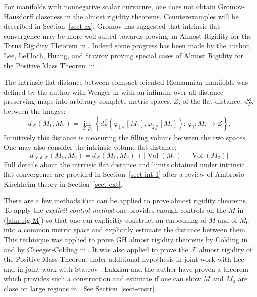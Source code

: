 \documentclass[12pt]{amsart}
\begin{document}
For manifolds with nonnegative scalar curvature, one does not
obtain Gromov-Hausdorff closeness in the almost rigidity theorems.
Counterexamples will be described in Section~\ref{sect-ex}.   
Gromov has suggested 
that intrinsic flat convergence may be more well suited towards proving
an Almost Rigidity for the Torus Rigidity Theorem in \cite{Gromov-Dirac}.  Indeed 
some progress has been made by the author, Lee, LeFloch,
Huang, and Stavrov proving special cases of Almost Rigidity for the
Positive Mass Theorem in \cite{LeeSormani1}\cite{LeFloch-Sormani-1}
\cite{HLS}\cite{Sormani-Stavrov-1}.   

The intrinsic flat distance between compact
oriented Riemannian manifolds was defined by the author with
Wenger in \cite{SorWen2} with an infimum over
all distance preserving maps into arbitrary complete metric spaces, $Z$,
of the flat distance, $d_F^Z$, between the images:
\begin{equation} \label{def-IF-1}
d_{\mathcal{F}}(M_1, M_2) = \inf_{Z, \varphi_i}\left\{ d_F^Z(\varphi_{1\#}[M_1], \varphi_{2\#}[M_2]):
\, \varphi_i: M_i\to Z
\right\}. 
\end{equation}
Intuitively this distance is measuring the filling volume between the two spaces.
One may also consider the intrinsic volume flat distance:
\begin{equation}\label{def-volF-1}
d_{{\operatorname{Vol}}\mathcal{F}}(M_1, M_2) = d_{\mathcal{F}}(M_1, M_2)
+|{\operatorname{Vol}}(M_1) - {\operatorname{Vol}}(M_2)|
\end{equation}
Full details about the intrinsic flat distance and limits obtained under
intrinsic flat convergence are provided in Section~\ref{sect-int-1}
after a review of Ambrosio-Kirchheim theory in Section~\ref{sect-ext}.

There are a few methods that can be applied to prove almost rigidity theorems.
To apply the {\em explicit control method} one provides enough controls on the $M$
in (\ref{alm-rig-M}) so that one can explicitly construct an embedding of
$M$ and of $M_0$ into a common metric space and explicitly estimate
the distance between them.  This technique was applied to prove GH almost rigidity theorems by Colding in \cite{Colding-volume} and by Cheeger-Colding
in \cite{ChCo-almost-rigidity}.
It was also
applied to prove the $\mathcal{F}$ almost rigidity 
of the Positive Mass Theorem under
additional hypothesis in joint work with Lee \cite{LeeSormani1} and 
in joint work with Stavrov \cite{Sormani-Stavrov-1}.
Lakzian and the author have proven a 
theorem which provides such a construction and estimate if one can
show $M$ and $M_0$ are close on large regions in \cite{Lakzian-Sormani}.
See Section~\ref{sect-cnstr}.
\end{document}
